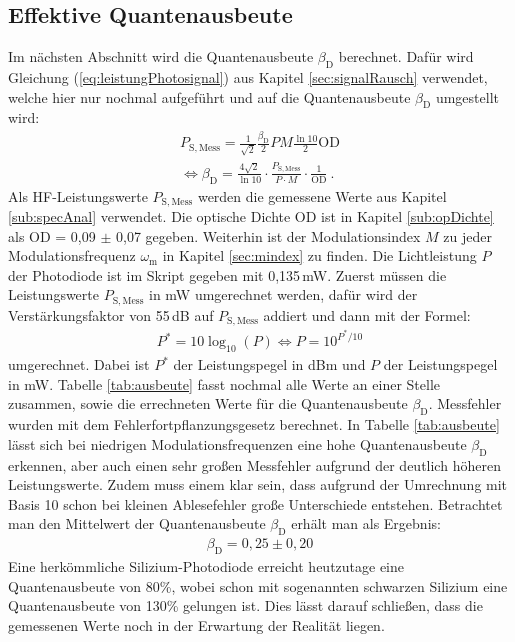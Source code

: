 \subsection{Effektive Quantenausbeute}
\label{sub:ausbeute}

Im nächsten Abschnitt wird die Quantenausbeute $\beta_\mathrm{D}$ berechnet. Dafür wird Gleichung (\ref{eq:leistungPhotosignal}) aus Kapitel \ref{sec:signalRausch} verwendet, welche hier nur nochmal aufgeführt und auf die Quantenausbeute $\beta_\mathrm{D}$ umgestellt wird:
\begin{gather}
    P_\mathrm{S,Mess} = \frac{1}{\sqrt{2}}\frac{\beta_\mathrm{D}}{2} P M \frac{\ln10}{2} \mathrm{OD}\\[0,5cm]
    \Leftrightarrow \beta_\mathrm{D} = \frac{4\sqrt{2}}{\ln10}\cdot\frac{P_\mathrm{S,Mess}}{P\cdot M}\cdot\frac{1}{\mathrm{OD}}~.
\end{gather}
Als HF-Leistungswerte $P_\mathrm{S,Mess}$ werden die gemessene Werte aus Kapitel \ref{sub:specAnal} verwendet. Die optische Dichte OD ist in Kapitel \ref{sub:opDichte} als OD = 0,09 $\pm$ 0,07 gegeben. Weiterhin ist der Modulationsindex $M$ zu jeder Modulationsfrequenz $\omega_\mathrm{m}$ in Kapitel \ref{sec:mindex} zu finden. Die Lichtleistung $P$ der Photodiode ist im Skript gegeben mit 0,135\,mW. Zuerst müssen die Leistungswerte $P_\mathrm{S,Mess}$ in mW umgerechnet werden, dafür wird der Verstärkungsfaktor von 55\,dB auf $P_\mathrm{S,Mess}$ addiert und dann mit der Formel:
\begin{gather}
    P^* = 10\log_{10}(P) \Leftrightarrow P = 10^{P^*/10}
\end{gather}
umgerechnet. \cite{anleitung} Dabei ist $P^*$ der Leistungspegel in dBm und $P$ der Leistungspegel in mW. Tabelle \ref{tab:ausbeute} fasst nochmal alle Werte an einer Stelle zusammen, sowie die errechneten Werte für die Quantenausbeute $\beta_\mathrm{D}$. Messfehler wurden mit dem Fehlerfortpflanzungsgesetz berechnet. In Tabelle \ref{tab:ausbeute} lässt sich bei niedrigen Modulationsfrequenzen eine hohe Quantenausbeute $\beta_\mathrm{D}$ erkennen, aber auch einen sehr großen Messfehler aufgrund der deutlich höheren Leistungswerte. Zudem muss einem klar sein, dass aufgrund der Umrechnung mit Basis 10 schon bei kleinen Ablesefehler große Unterschiede entstehen. Betrachtet man den Mittelwert der Quantenausbeute $\beta_\mathrm{D}$ erhält man als Ergebnis:
\begin{gather}
    \boxed{\beta_\mathrm{D} = 0,25 \pm 0,20}
\end{gather}
Eine herkömmliche Silizium-Photodiode erreicht heutzutage eine Quantenausbeute von 80\%, wobei schon mit sogenannten schwarzen Silizium eine Quantenausbeute von 130\% gelungen ist. \cite{siPD} Dies lässt darauf schließen, dass die gemessenen Werte noch in der Erwartung der Realität liegen.
